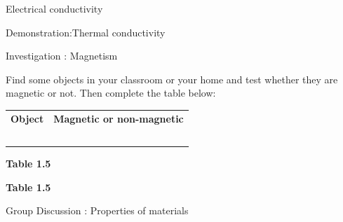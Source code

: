 \begin{iexperiment}{Electrical conductivity}
\begin{gexperiment}{Demonstration:Thermal conductivity}
\begin{gexperiment}{Investigation : Magnetism}
{      \label{m38706*id67227}Find some objects in your classroom or your home and test whether they are magnetic or not. Then complete the table below:\par 
          \begin{table}[H]
        \begin{center}
      \label{m38706*id67234}
    \noindent
      \tablelasttail{}
      \begin{xtabular}[t]{|l|l|}\hline
                \textbf{Object}
               &
                \textbf{Magnetic or non-magnetic}
     \tabularnewline{}
         &
     \tabularnewline{}
         &
     \tabularnewline{}
         &
     \tabularnewline{}
         &
     \tabularnewline{}
         &
     \tabularnewline{}
    \end{xtabular}
      \end{center}
    \begin{center}{\small\bfseries Table 1.5}\end{center}
    \begin{caption}{\small\bfseries Table 1.5}\end{caption}
\end{table}}
\end{gexperiment}
    \par
\label{m38706*secfhsst!!!underscore!!!id616}
            \begin{Discussion}{Group Discussion : Properties of materials}{
}
\end{Discussion}
\end{gexperiment}
\end{iexperiment}
